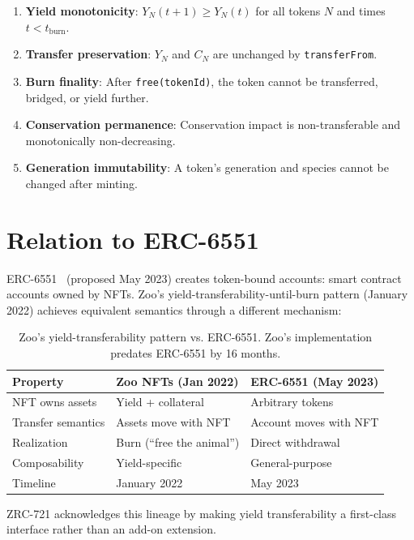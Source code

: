 \documentclass[11pt,letterpaper]{article}
\begin{document}
\begin{enumerate}
    \item \textbf{Yield monotonicity}: $Y_N(t+1) \geq Y_N(t)$ for all tokens $N$ and times $t < t_{\text{burn}}$.
    \item \textbf{Transfer preservation}: $Y_N$ and $C_N$ are unchanged by \texttt{transferFrom}.
    \item \textbf{Burn finality}: After \texttt{free(tokenId)}, the token cannot be transferred, bridged, or yield further.
    \item \textbf{Conservation permanence}: Conservation impact is non-transferable and monotonically non-decreasing.
    \item \textbf{Generation immutability}: A token's generation and species cannot be changed after minting.
\end{enumerate}

\section{Relation to ERC-6551}

ERC-6551~\cite{erc-6551} (proposed May 2023) creates token-bound accounts: smart contract accounts owned by NFTs. Zoo's yield-transferability-until-burn pattern (January 2022) achieves equivalent semantics through a different mechanism:

\begin{table}[t]
\centering
\begin{tabular}{lll}
\toprule
\textbf{Property} & \textbf{Zoo NFTs (Jan 2022)} & \textbf{ERC-6551 (May 2023)} \\
\midrule
NFT owns assets & Yield + collateral & Arbitrary tokens \\
Transfer semantics & Assets move with NFT & Account moves with NFT \\
Realization & Burn (``free the animal'') & Direct withdrawal \\
Composability & Yield-specific & General-purpose \\
Timeline & January 2022 & May 2023 \\
\bottomrule
\end{tabular}
\caption{Zoo's yield-transferability pattern vs. ERC-6551. Zoo's implementation predates ERC-6551 by 16 months.}
\label{tab:erc6551}
\end{table}

ZRC-721 acknowledges this lineage by making yield transferability a first-class interface rather than an add-on extension.
\end{document}
